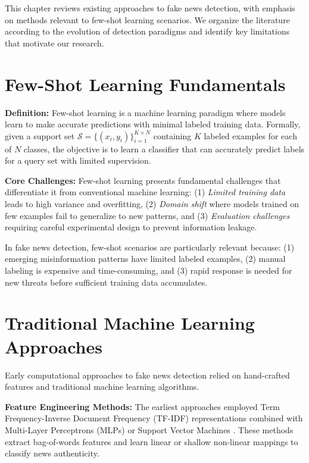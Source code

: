 


This chapter reviews existing approaches to fake news detection, with emphasis on methods relevant to few-shot learning scenarios. We organize the literature according to the evolution of detection paradigms and identify key limitations that motivate our research.

\section{Few-Shot Learning Fundamentals}

\textbf{Definition:} Few-shot learning is a machine learning paradigm where models learn to make accurate predictions with minimal labeled training data. Formally, given a support set $\mathcal{S} = \{(x_i, y_i)\}_{i=1}^{K \times N}$ containing $K$ labeled examples for each of $N$ classes, the objective is to learn a classifier that can accurately predict labels for a query set with limited supervision.

\textbf{Core Challenges:} Few-shot learning presents fundamental challenges that differentiate it from conventional machine learning: (1) \emph{Limited training data} leads to high variance and overfitting, (2) \emph{Domain shift} where models trained on few examples fail to generalize to new patterns, and (3) \emph{Evaluation challenges} requiring careful experimental design to prevent information leakage.

In fake news detection, few-shot scenarios are particularly relevant because: (1) emerging misinformation patterns have limited labeled examples, (2) manual labeling is expensive and time-consuming, and (3) rapid response is needed for new threats before sufficient training data accumulates.

\section{Traditional Machine Learning Approaches}

Early computational approaches to fake news detection relied on hand-crafted features and traditional machine learning algorithms.

\textbf{Feature Engineering Methods:} The earliest approaches employed Term Frequency-Inverse Document Frequency (TF-IDF) representations combined with Multi-Layer Perceptrons (MLPs) or Support Vector Machines \cite{perez2017automatic, wang2017liar}. These methods extract bag-of-words features and learn linear or shallow non-linear mappings to classify news authenticity.

